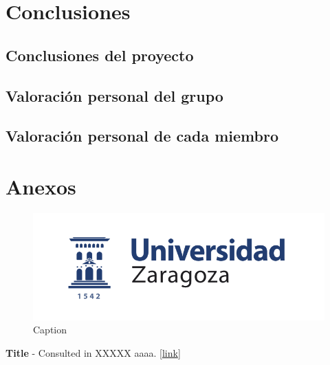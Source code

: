 \documentclass[a4paper]{article}
\begin{document}
\section{Conclusiones}
	\subsection{Conclusiones del proyecto}
	\subsection{Valoración personal del grupo}
	\subsection{Valoración personal de cada miembro}
\section{Anexos}

\begin{figure}[H]
	\centering
	\includegraphics[width=1\linewidth]{logoUZ.png}
	\caption{Caption}
	\label{fig:pf}
\end{figure}

\newpage
\begin{thebibliography}{99} 
 \textbf{Title} - Consulted in XXXXX aaaa. [\url{link}]

\end{thebibliography}
\end{document}
